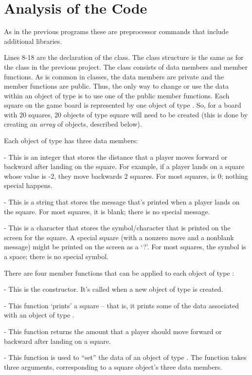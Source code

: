\section{Analysis of the Code}


As in the previous programs these are preprocessor commands that include additional libraries.  


Lines 8-18 are the declaration of the  class.  The class structure is the same as for the  class in the previous project.  The class consists of data members and member functions.  As is common in classes, the data members are private and the member functions are public.  Thus, the only way to change or use the data within an object of type  is to use one of the public member functions.  Each square on the game board is represented by one object of type .  So, for a board with 20 squares, 20 objects of type square will need to be created (this is done by creating an \emph{array} of  objects, described below).

Each object of type  has three data members:
\begin{tight_enumerate}
\item {} - This is an integer that stores the distance that a player moves forward or backward after landing on the square.  For example, if a player lands on a square whose  value is -2, they move backwards 2 squares.  For most squares,  is 0; nothing special happens.
\item{} - This is a string that stores the message that's printed when a player lands on the square.  For most squares, it is blank; there is no special message.
\item{} - This is a character that stores the symbol/character that is printed on the screen for the square.  A special square (with a nonzero move and a nonblank message) might be printed on the screen as a `?'.  For most squares, the symbol is a space; there is no special symbol.
\end{tight_enumerate}

There are four member functions that can be applied to each object of type :
\begin{tight_enumerate}
\item {} - This is the constructor.  It's called when a new object of type  is created.
\item {} - This function `prints' a square -- that is, it prints some of the data associated with an object of type .
\item {} - This function returns the amount that a player should move forward or backward after landing on a square.
\item {} - This function is used to ``set'' the data of an object of type .  The function takes three arguments, corresponding to a square object's three data members.
\end{tight_enumerate}

